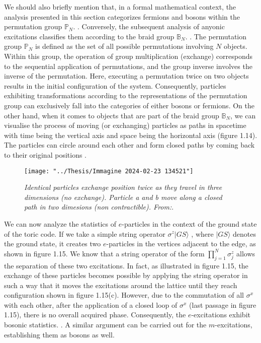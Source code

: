 \documentclass{Configuration_Files/PoliMi3i_thesis}
\begin{document}
We should also briefly mention that, in a formal mathematical context, the analysis presented in this section categorizes fermions and bosons within the permutation group $\mathbb{P}_N$. {\cite{Cor23}}. Conversely, the subsequent analysis of anyonic excitations classifies them according to the braid group $\mathbb{B}_N$. {\cite{Rao16}}. \newline
The permutation group $\mathbb{P}_N$ is defined as the set of all possible permutations involving $N$ objects. Within this group, the operation of group multiplication (exchange) corresponds to the sequential application of permutations, and the group inverse involves the inverse of the permutation. Here, executing a permutation twice on two objects results in the initial configuration of the system. Consequently, particles exhibiting transformations according to the representations of the permutation group can exclusively fall into the categories of either bosons or fermions. On the other hand, when it comes to objects that are part of the braid group $\mathbb{B}_N$, we can visualise the process of moving (or exchanging) particles as paths in spacetime with time being the vertical axis and space being the horizontal axis (figure 1.14). The particles can circle around each other and form closed paths by coming back to their original positions {\cite{Wil91}}. \newline


\begin{figure}
	\centering
	\texttt{[image: "../Thesis/Immagine 2024-02-23 134521"]}
	\caption{\textit{ Identical particles exchange position twice as
			they travel in three dimensions (no exchange). Particle a and b move along a closed path in two dimesions (non contractible). From:\cite{Wil91}}.}
	\label{fig:immagine-2024-02-23-134521}
\end{figure}

\newpage
We can now analyze the statistics of $e$-particles in the context of the ground state of the toric code. If we take a simple string operator $\sigma^z|GS\rangle$ , where $|GS\rangle$ denotes the ground state, it creates two $e$-particles in the vertices adjacent to the edge, as shown in figure 1.15. We know that a string operator of the form $\prod_{j=1}^{N} \sigma_j^z$ allows the separation of these two excitations. In fact, as illustrated in figure 1.15, the exchange of these particles becomes possible by applying the string operator in such a way that it moves the excitations around the lattice until they reach configuration shown in figure 1.15(c). However, due to the commutation of all $\sigma^x$ with each other, after the application of a closed loop of $\sigma^x$ (last passage in figure 1.15), there is no overall acquired phase. Consequently, the $e$-excitations exhibit bosonic statistics. {\cite{Rao16, Her20}}. A similar argument can be carried out for the $m$-excitations, establishing them as bosons as well. 
\end{document}
